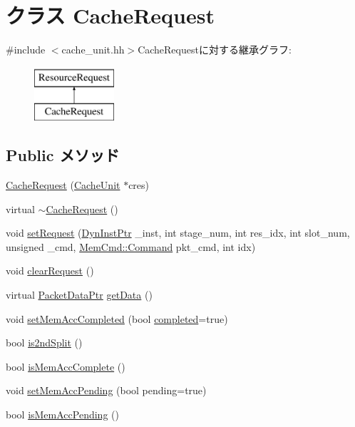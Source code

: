\hypertarget{classCacheRequest}{
\section{クラス CacheRequest}
\label{classCacheRequest}
}


{\ttfamily \#include $<$cache\_\-unit.hh$>$}CacheRequestに対する継承グラフ:\begin{figure}[H]
\begin{center}
\leavevmode
\includegraphics[height=2cm]{classCacheRequest}
\end{center}
\end{figure}
\subsection*{Public メソッド}
\begin{DoxyCompactItemize}
\item 
\hyperlink{classCacheRequest_a5bf039e41366d603b045c6472310d78a}{CacheRequest} (\hyperlink{classCacheUnit}{CacheUnit} $\ast$cres)
\item 
virtual \hyperlink{classCacheRequest_a48decb676036a97918cc58ac4a86e99d}{$\sim$CacheRequest} ()
\item 
void \hyperlink{classCacheRequest_a84f6f3e65e793185ef653dd30dc70bce}{setRequest} (\hyperlink{classRefCountingPtr}{DynInstPtr} \_\-inst, int stage\_\-num, int res\_\-idx, int slot\_\-num, unsigned \_\-cmd, \hyperlink{classMemCmd_a2afce0a47a93eee73a314d53e4890153}{MemCmd::Command} pkt\_\-cmd, int idx)
\item 
void \hyperlink{classCacheRequest_ace5d1d4025bbb180364fdcb74e7a7c57}{clearRequest} ()
\item 
virtual \hyperlink{packet_8hh_ae85a9de970f801a77a1ad88ee2b39ea2}{PacketDataPtr} \hyperlink{classCacheRequest_a050fcb534c3978b1caf1556a4102e320}{getData} ()
\item 
void \hyperlink{classCacheRequest_af0fe97a3ad40ede3efefabb5963b90b1}{setMemAccCompleted} (bool \hyperlink{classResourceRequest_a8c06e370b709d689e392a4b7b53b47c5}{completed}=true)
\item 
bool \hyperlink{classCacheRequest_af5773a400d8be1f558fb09c16a87df3f}{is2ndSplit} ()
\item 
bool \hyperlink{classCacheRequest_a63ec568bcbc0ea1b45a4d351285768f0}{isMemAccComplete} ()
\item 
void \hyperlink{classCacheRequest_ac72925124571fd902778ad38f1606a88}{setMemAccPending} (bool pending=true)
\item 
bool \hyperlink{classCacheRequest_a4cde89a6a447d3a380be174fd290160c}{isMemAccPending} ()
\end{DoxyCompactItemize}
